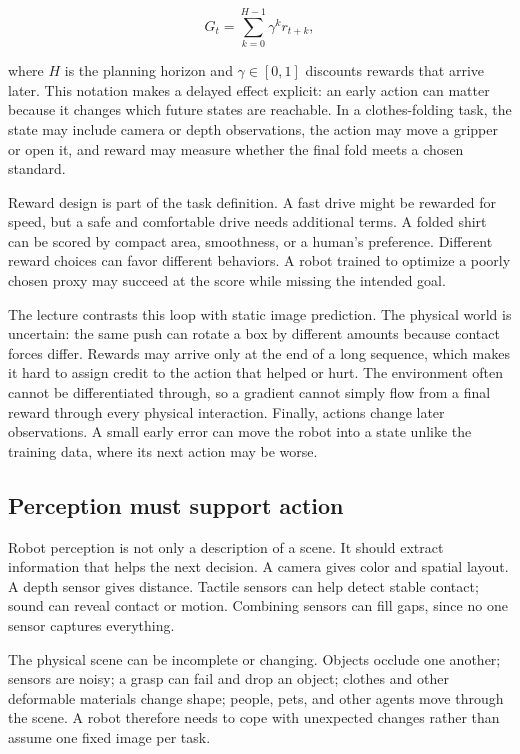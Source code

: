 \[
G_t=\sum_{k=0}^{H-1}\gamma^k r_{t+k},
\]

where \(H\) is the planning horizon and \(\gamma\in[0,1]\) discounts rewards that arrive later. This notation makes a delayed effect explicit: an early action can matter because it changes which future states are reachable. In a clothes-folding task, the state may include camera or depth observations, the action may move a gripper or open it, and reward may measure whether the final fold meets a chosen standard.

Reward design is part of the task definition. A fast drive might be rewarded for speed, but a safe and comfortable drive needs additional terms. A folded shirt can be scored by compact area, smoothness, or a human's preference. Different reward choices can favor different behaviors. A robot trained to optimize a poorly chosen proxy may succeed at the score while missing the intended goal.

The lecture contrasts this loop with static image prediction. The physical world is uncertain: the same push can rotate a box by different amounts because contact forces differ. Rewards may arrive only at the end of a long sequence, which makes it hard to assign credit to the action that helped or hurt. The environment often cannot be differentiated through, so a gradient cannot simply flow from a final reward through every physical interaction. Finally, actions change later observations. A small early error can move the robot into a state unlike the training data, where its next action may be worse.

\subsection{Perception must support action}\label{04-visual-computing-ii-ch034-perception-must-support-action}

\hypertarget{04-visual-computing-ii-ch034-perception-must-support-action}{}

Robot perception is not only a description of a scene. It should extract information that helps the next decision. A camera gives color and spatial layout. A depth sensor gives distance. Tactile sensors can help detect stable contact; sound can reveal contact or motion. Combining sensors can fill gaps, since no one sensor captures everything.

The physical scene can be incomplete or changing. Objects occlude one another; sensors are noisy; a grasp can fail and drop an object; clothes and other deformable materials change shape; people, pets, and other agents move through the scene. A robot therefore needs to cope with unexpected changes rather than assume one fixed image per task.

